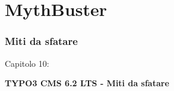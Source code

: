 %

\section{MythBuster}
\begin{frame}[fragile]
	\frametitle{Miti da sfatare}

	\begin{center}\huge{Capitolo 10:}\end{center}
	\begin{center}\huge{\color{typo3darkgrey}\textbf{TYPO3 CMS 6.2 LTS - Miti da sfatare}}\end{center}

\end{frame}



